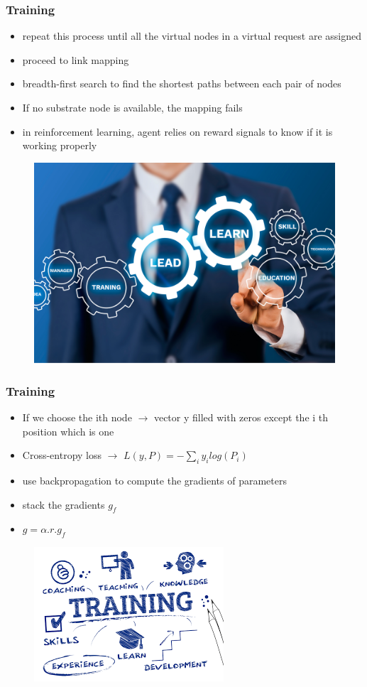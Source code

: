 \documentclass{beamer}
\begin{document}
\begin{frame}
	\frametitle{Training}
	\begin{itemize}
		\item {repeat this process until all the virtual nodes in a virtual
			request are assigned}
		\item {proceed to link mapping}
				\item{breadth-first search to find the shortest
			paths between each pair of nodes}
		\item {If no substrate
			node is available, the mapping fails}
	\item {in reinforcement learning,  agent relies
		on reward signals to know if it is working properly}
	\end{itemize}
\begin{figure}
	\centering
	\includegraphics[width=0.4\linewidth]{../Images/training}
	\label{fig:training}
\end{figure}
\end{frame}
\begin{frame}
\frametitle{Training}
	\begin{itemize}
		\item {If we choose the ith node $\to$ vector y filled with zeros
			except the i th position which is one}
		\item {Cross-entropy loss   $\to$   $L(y,P)=-\sum_iy_ilog(P_i)$}
		\item {use backpropagation to
			compute the gradients of parameters}
		\item {stack the gradients $g_f$}
		\item {$g=\alpha.r.g_f$}
	\end{itemize}
\begin{figure}
	\centering
	\includegraphics[width=0.5\linewidth]{../Images/training2}
	\label{fig:training2}
\end{figure}
\end{frame}
\end{document}
